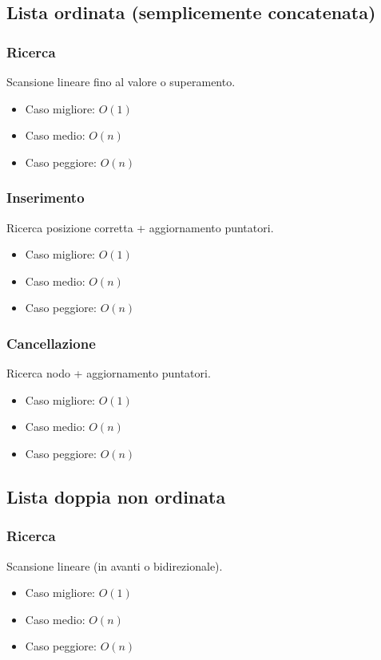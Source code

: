 \documentclass[a4paper,12pt]{article}
\begin{document}
\subsection{Lista ordinata (semplicemente concatenata)}

\subsubsection{Ricerca}
Scansione lineare fino al valore o superamento.
\begin{itemize}
    \item Caso migliore: $O(1)$
    \item Caso medio: $O(n)$
    \item Caso peggiore: $O(n)$
\end{itemize}

\subsubsection{Inserimento}
Ricerca posizione corretta + aggiornamento puntatori.
\begin{itemize}
    \item Caso migliore: $O(1)$
    \item Caso medio: $O(n)$
    \item Caso peggiore: $O(n)$
\end{itemize}

\subsubsection{Cancellazione}
Ricerca nodo + aggiornamento puntatori.
\begin{itemize}
    \item Caso migliore: $O(1)$
    \item Caso medio: $O(n)$
    \item Caso peggiore: $O(n)$
\end{itemize}


\subsection{Lista doppia non ordinata}

\subsubsection{Ricerca}
Scansione lineare (in avanti o bidirezionale).
\begin{itemize}
    \item Caso migliore: $O(1)$
    \item Caso medio: $O(n)$
    \item Caso peggiore: $O(n)$
\end{itemize}
\end{document}
